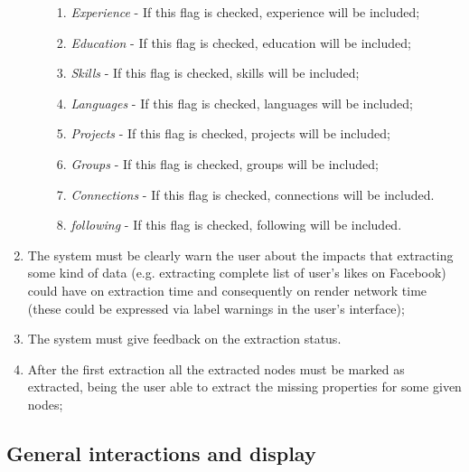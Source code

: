 \begin{enumerate}
\begin{enumerate}
        \begin{enumerate}
            \item \textit{Experience} - If this flag is checked, experience will be included;
            \item \textit{Education} - If this flag is checked, education will be included;
            \item \textit{Skills} - If this flag is checked, skills will be included;
            \item \textit{Languages} - If this flag is checked, languages will be included;
            \item \textit{Projects} - If this flag is checked, projects will be included;
            \item \textit{Groups} - If this flag is checked, groups will be included;
            \item \textit{Connections} - If this flag is checked, connections will be included.
            \item \textit{following} - If this flag is checked, following will be included.
        \end{enumerate}
    \end{enumerate}
    \item The system must be clearly warn the user about the impacts that extracting some kind of data (e.g. extracting complete list of user's likes on Facebook)
    could have on extraction time and consequently on render network time (these could be expressed via label warnings in the user's interface);
    \item The system must give feedback on the extraction status.
    \item After the first extraction all the extracted nodes must be marked as extracted, being the user able to extract the missing properties for some given nodes;
\end{enumerate}

\subsection{General interactions and display}

